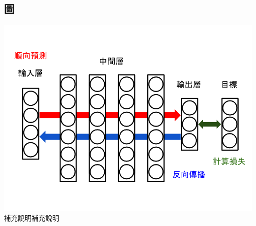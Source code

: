 %

\newpage
{} %
\renewcommand{\bibname}{\protect\makebox[5cm][s]{\nameRef}}



%
\newpage
\chapter*{\protect{}} %
\section*{圖}
{
\centering
\includegraphics[scale=0.5]{images/chap2_dnn.png}
補充說明補充說明
}
%

